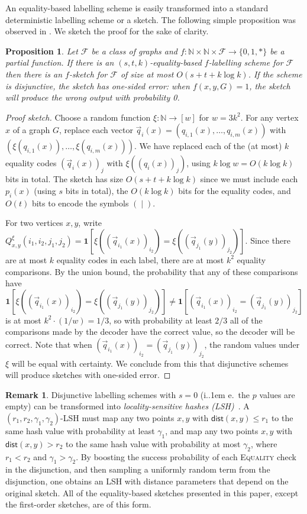 \documentclass[11pt]{article}
\newcommand*\ie{i.\kern.1em e.\ }
\newtheorem{proposition}[thm]{Proposition}
\theoremstyle{definition}
\newtheorem{rem}[thm]{Remark}
\renewcommand{\leq}{\leqslant}
\def\F {{\mathcal F}}
\def\bN{{\mathbb N}}
\newcommand{\dist}{\mathsf{dist}}
\newcommand{\ind}[1]{\mathbf{1}[ #1 ]}
\begin{document}
An equality-based labelling scheme is easily transformed into a standard deterministic labelling
scheme or a sketch.  The following simple proposition was observed in \cite{HWZ21}. We sketch the
proof for the sake of clarity. 
\begin{proposition}\label{prop:eqbased}
Let $\F$ be a class of graphs and $f : \bN \times \bN \times \F \to \{0,1,*\}$ be a partial
function. If there is an $(s,t,k)$-equality-based $f$-labelling scheme for $\F$ then there is an
$f$-sketch for $\F$ of size at most $O(s + t + k \log k)$. If the scheme is disjunctive, the sketch
has \emph{one-sided error}: when $f(x,y,G) = 1$, the sketch will produce the wrong output with
probability 0.
\end{proposition}
\begin{proof}[Proof sketch]
Choose a random function $\xi : \bN \to [w]$ for $w = 3k^2$. For any vertex $x$ of a graph $G$,
replace each vector $\vec q_i(x) = (q_{i,1}(x), \dotsc, q_{i,m}(x))$ with $(\xi(q_{i,1}(x)), \dotsc,
\xi(q_{i,m}(x)))$. We have replaced each of the (at most) $k$ equality codes $(\vec q_{i}(x))_j$
with $\xi((q_{i}(x))_j)$, using $k\log w = O(k \log k)$ bits in total. The sketch has size $O(s + t
+ k \log k)$ since we must include each $p_i(x)$ (using $s$ bits in total), the $O(k \log k)$ bits
for the equality codes, and $O(t)$ bits to encode the symbols $( \; | \; )$.

For two vertices $x,y$, write $Q_{x,y}^\xi(i_1,i_2,j_1,j_2) = \ind{\xi((\vec q_{i_1}(x))_{i_2}) =
\xi((\vec q_{j_1}(y))_{j_2})}$. Since there are at most $k$ equality codes in each label, there are
at most $k^2$ equality comparisons. By the union bound, the probability that any of these
comparisons have
\[
\ind{\xi((\vec q_{i_1}(x))_{i_2}) = \xi((\vec q_{j_1}(y))_{j_2})} 
\neq \ind{(\vec q_{i_1}(x))_{i_2} = (\vec q_{j_1}(y))_{j_2}} 
\]
is at most $k^2 \cdot (1/w) = 1/3$, so with probability at least $2/3$ all of the comparisons made
by the decoder have the correct value, so the decoder will be correct. Note that when $(\vec
q_{i_1}(x))_{i_2} = (\vec q_{j_1}(y))_{j_2}$, the random values under $\xi$ will be equal with
certainty. We conclude from this that disjunctive schemes will produce sketches with one-sided
error.
\end{proof}

\begin{rem}
\label{remark:lsh}
Disjunctive labelling schemes with $s=0$ (\ie the $p$ values are empty) can be transformed into
\emph{locality-sensitive hashes (LSH)}~\cite{IM98}. A $(r_1,r_2,\gamma_1,\gamma_2)$-LSH must map any
two points $x,y$ with $\dist(x,y) \leq r_1$ to the same hash value with probability at least
$\gamma_1$, and map any two points $x,y$ with $\dist(x,y) > r_2$ to the same hash value with
probability at most $\gamma_2$, where $r_1 < r_2$ and $\gamma_1 > \gamma_2$. By boosting the success
probability of each \textsc{Equality} check in the disjunction, and then sampling a uniformly random
term from the disjunction, one obtains an LSH with distance parameters that depend on the original
sketch. All of the equality-based sketches presented in this paper, except the first-order sketches,
are of this form.
\end{rem}
\end{document}
